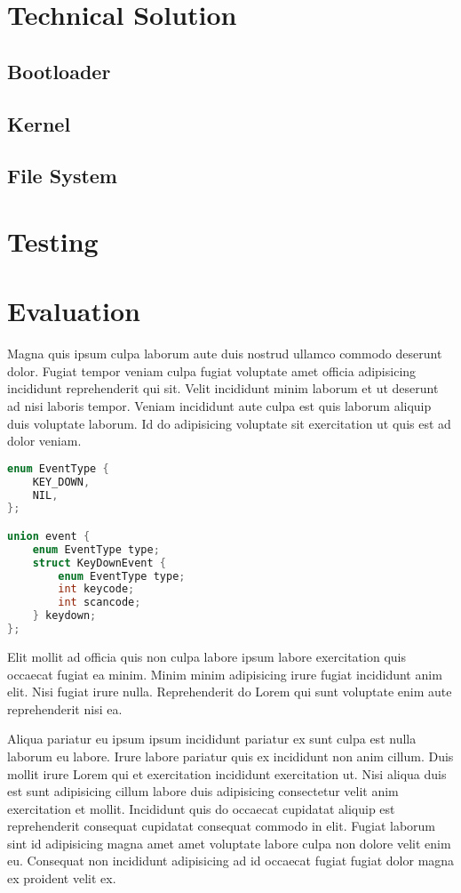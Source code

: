 \documentclass{article}
\begin{document}

\tableofcontents
\newpage





\section{Technical Solution}
\subsection{Bootloader}
\subsection{Kernel}
\subsection{File System}

\section{Testing}
\section{Evaluation}


Magna quis ipsum culpa laborum aute duis nostrud ullamco commodo deserunt dolor. Fugiat tempor veniam culpa fugiat voluptate amet officia adipisicing incididunt reprehenderit qui sit. Velit incididunt minim laborum et ut deserunt ad nisi laboris tempor. Veniam incididunt aute culpa est quis laborum aliquip duis voluptate laborum. Id do adipisicing voluptate sit exercitation ut quis est ad dolor veniam.

\begin{lstlisting}[language=C]
enum EventType {
	KEY_DOWN,
	NIL,
};

union event {
	enum EventType type;
	struct KeyDownEvent {
		enum EventType type;
		int keycode;
		int scancode;
	} keydown;
};
\end{lstlisting}

Elit mollit ad officia quis non culpa labore ipsum labore exercitation quis occaecat fugiat ea minim. Minim minim adipisicing irure fugiat incididunt anim elit. Nisi fugiat irure nulla. Reprehenderit do Lorem qui sunt voluptate enim aute reprehenderit nisi ea.

Aliqua pariatur eu ipsum ipsum incididunt pariatur ex sunt culpa est nulla laborum eu labore. Irure labore pariatur quis ex incididunt non anim cillum. Duis mollit irure Lorem qui et exercitation incididunt exercitation ut. Nisi aliqua duis est sunt adipisicing cillum labore duis adipisicing consectetur velit anim exercitation et mollit. Incididunt quis do occaecat cupidatat aliquip est reprehenderit consequat cupidatat consequat commodo in elit. Fugiat laborum sint id adipisicing magna amet amet voluptate labore culpa non dolore velit enim eu. Consequat non incididunt adipisicing ad id occaecat fugiat fugiat dolor magna ex proident velit ex.
\end{document}
